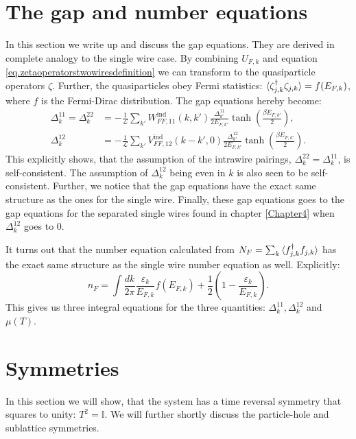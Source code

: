 \section{The gap and number equations}
\label{sec.2wiresgapandnumberequations}
In this section we write up and discuss the gap equations. They are derived in complete analogy to the single wire case. By combining $U_{F,k}$ and equation \ref{eq.zetaoperatorstwowiresdefinition} we can transform to the quasiparticle operators $\zeta$. Further, the quasiparticles obey Fermi statistics: $\braket{\zeta^\dagger_{j,k}\zeta_{j, k}} = f(E_{F,k})$, where $f$ is the Fermi-Dirac distribution. The gap equations hereby become:
\begin{align}
\Delta^{11}_k = \Delta^{22}_k &= -\frac{1}{\mathcal{L}}\sum_{k'} W^\text{ind}_{FF,11}(k,k')\frac{\Delta^{11}_{k'}}{2E_{F,k'}}\tanh\left(\frac{\beta E_{F,k'}}{2}\right), \nonumber \\
\Delta^{12}_k &= -\frac{1}{\mathcal{L}}\sum_{k'} V^\text{ind}_{FF,12}(k - k',0)\frac{\Delta^{12}_{k'}}{2E_{F,k'}}\tanh\left(\frac{\beta E_{F,k'}}{2}\right).
\label{eq.2wiresgapequations}
\end{align}
This explicitly shows, that the assumption of the intrawire pairings, $\Delta^{22}_k = \Delta^{11}_k$, is self-consistent. The assumption of $\Delta^{12}_k$ being even in $k$ is also seen to be self-consistent. Further, we notice that the gap equations have the exact same structure as the ones for the single wire. Finally, these gap equations goes to the gap equations for the separated single wires found in chapter \ref{Chapter4} when $\Delta^{12}_k$ goes to $0$.  

It turns out that the number equation calculated from $N_F = \sum_k \braket{f^\dagger_{j,k}f_{j,k}}$ has the exact same structure as the single wire number equation as well. Explicitly: 
\begin{equation}
n_F = \int \frac{dk}{2\pi} \frac{\varepsilon_k}{E_{F,k}}f(E_{F,k}) + \frac{1}{2}\left(1 - \frac{\varepsilon_k}{E_{F,k}}\right). 
\label{eq.numberequationtwowires}
\end{equation}
This gives us three integral equations for the three quantities: $\Delta^{11}_k, \Delta^{12}_k$ and $\mu(T)$.

\section{Symmetries}
\label{sec.2wiressymmetries}
In this section we will show, that the system has a time reversal symmetry that squares to unity: $T^2 = \mathbb{I}$. We will further shortly discuss the particle-hole and sublattice symmetries. 

